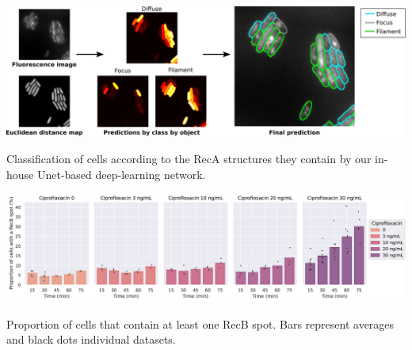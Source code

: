 \begin{suppfigure*}[htbp]
\begin{center}
\end{center}
\caption{}
\label{SIFig:frame_intervals}
\end{suppfigure*}


\begin{suppfigure*}[htbp]
\begin{center}
\includegraphics[width=\textwidth]{SI_Figures/ObjectClassifier.pdf}
\end{center}
\caption{Classification of cells according to the RecA structures they contain by our in-house Unet-based deep-learning network.}
\label{SIFig:object_class}
\end{suppfigure*}


\begin{suppfigure*}[htbp]
\begin{center}
\includegraphics[width=\textwidth]{SI_Figures/Cells_1spot.pdf}
\end{center}
\caption{Proportion of cells that contain at least one RecB spot. Bars represent averages and black dots individual datasets.}
\label{SIFig:cells_1spot}
\end{suppfigure*}
